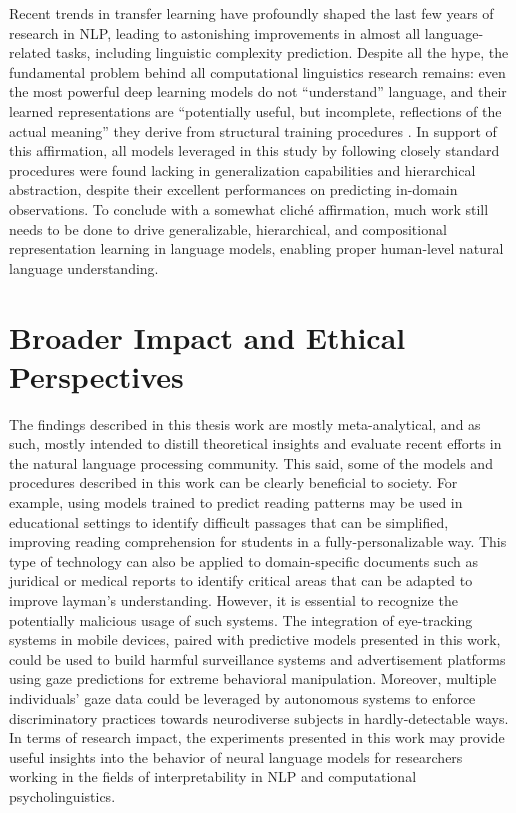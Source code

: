 \documentclass[a4paper, nobind]{templates/ociamthesis}
\begin{document}
Recent trends in transfer learning have profoundly shaped the last few years of research in NLP, leading to astonishing improvements in almost all language-related tasks, including linguistic complexity prediction. Despite all the hype, the fundamental problem behind all computational linguistics research remains: even the most powerful deep learning models do not ``understand'' language, and their learned representations are ``potentially useful, but incomplete, reflections of the actual meaning'' they derive from structural training procedures \autocite{bender-koller-2020-climbing}. In support of this affirmation, all models leveraged in this study by following closely standard procedures were found lacking in generalization capabilities and hierarchical abstraction, despite their excellent performances on predicting in-domain observations. To conclude with a somewhat cliché affirmation, much work still needs to be done to drive generalizable, hierarchical, and compositional representation learning in language models, enabling proper human-level natural language understanding.

\hypertarget{broader-impact-and-ethical-perspectives}{%
\section*{Broader Impact and Ethical Perspectives}\label{broader-impact-and-ethical-perspectives}}

The findings described in this thesis work are mostly meta-analytical, and as such, mostly intended to distill theoretical insights and evaluate recent efforts in the natural language processing community. This said, some of the models and procedures described in this work can be clearly beneficial to society. For example, using models trained to predict reading patterns may be used in educational settings to identify difficult passages that can be simplified, improving reading comprehension for students in a fully-personalizable way. This type of technology can also be applied to domain-specific documents such as juridical or medical reports to identify critical areas that can be adapted to improve layman's understanding. However, it is essential to recognize the potentially malicious usage of such systems. The integration of eye-tracking systems in mobile devices, paired with predictive models presented in this work, could be used to build harmful surveillance systems and advertisement platforms using gaze predictions for extreme behavioral manipulation. Moreover, multiple individuals' gaze data could be leveraged by autonomous systems to enforce discriminatory practices towards neurodiverse subjects in hardly-detectable ways. In terms of research impact, the experiments presented in this work may provide useful insights into the behavior of neural language models for researchers working in the fields of interpretability in NLP and computational psycholinguistics.
\end{document}
